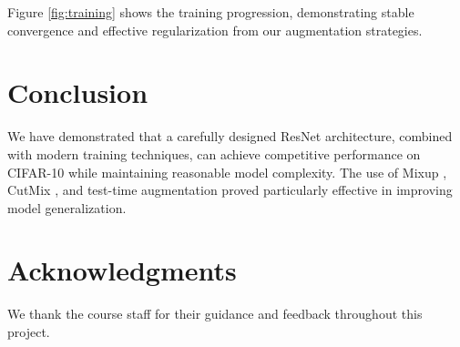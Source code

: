 \documentclass[letterpaper]{article} %
\begin{document}
Figure \ref{fig:training} shows the training progression, demonstrating stable convergence and effective regularization from our augmentation strategies.

\section{Conclusion}
We have demonstrated that a carefully designed ResNet architecture, combined with modern training techniques, can achieve competitive performance on CIFAR-10 while maintaining reasonable model complexity. The use of Mixup \cite{zhang2018mixup}, CutMix \cite{yun2019cutmix}, and test-time augmentation proved particularly effective in improving model generalization.

\section{Acknowledgments}
We thank the course staff for their guidance and feedback throughout this project.



\end{document}
